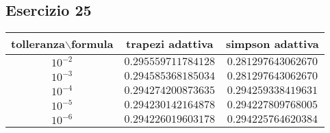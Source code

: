 \subsection{Esercizio 25}
\begin{tabular}{|c c c |}
        \hline
        tolleranza$\backslash$formula & trapezi adattiva          &simpson adattiva\\
        \hline
        $10^{-2}$                     &$0.295559711784128$        &$0.281297643062670$ \\
        \hline
        $10^{-3}$                     &$0.294585368185034$        &$0.281297643062670$ \\
        \hline
        $10^{-4}$                     &$0.294274200873635$        &$0.294259338419631$ \\
        \hline
        $10^{-5}$                     &$0.294230142164878$        &$0.294227809768005$ \\
        \hline
        $10^{-6}$                     &$0.294226019603178$        &$0.294225764620384$ \\
        \hline
    \end{tabular}
